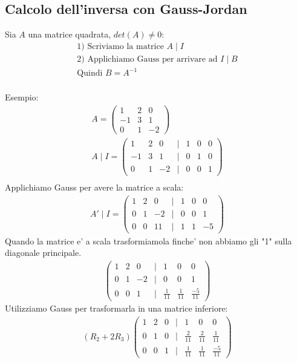 \documentclass{article}
\begin{document}
\subsection{Calcolo dell'inversa con Gauss-Jordan}
Sia $A$ una matrice quadrata, $det(A)\neq0$:
\begin{align*}
  \text{1) Scriviamo la matrice } A \mid I \\
  \text{2) Applichiamo Gauss per arrivare ad } I \mid B \\
  \text{Quindi } B=A^{-1}
\end{align*}
\\Esempio:
\begin{align*}
    A=\begin{pmatrix}
        1&2&0\\-1&3&1\\0&1&-2
    \end{pmatrix} \\
    A\mid I=\begin{pmatrix}
    1 & 2 & 0 & | & 1 & 0 & 0 \\
    -1 & 3 & 1 & | & 0 & 1 & 0 \\
    0 & 1 & -2 & | & 0 & 0 & 1
    \end{pmatrix} \\
\end{align*}
Applichiamo Gauss per avere la matrice a scala:
\begin{align*}
    A'\mid I=\begin{pmatrix}
        1&2&0&|&1&0&0\\
        0&1&-2&|&0&0&1\\
        0&0&11&|&1&1&-5
    \end{pmatrix}
\end{align*}
Quando la matrice e' a scala trasformiamola finche' non abbiamo gli "1" sulla diagonale principale.
\begin{align*}
    \begin{pmatrix}
        1&2&0&|&1&0&0\\
        0&1&-2&|&0&0&1\\
        0&0&1&|&\frac{1}{11}&\frac{1}{11}&\frac{-5}{11}
    \end{pmatrix}
\end{align*}
Utilizziamo Gauss per trasformarla in una matrice inferiore:
\begin{align*}
    (R_2+2R_3)
    \begin{pmatrix}
        1&2&0&|&1&0&0\\
        0&1&0&|&\frac{2}{11}&\frac{2}{11}&\frac{1}{11}\\
        0&0&1&|&\frac{1}{11}&\frac{1}{11}&\frac{-5}{11}
    \end{pmatrix}
\end{align*}
\end{document}

